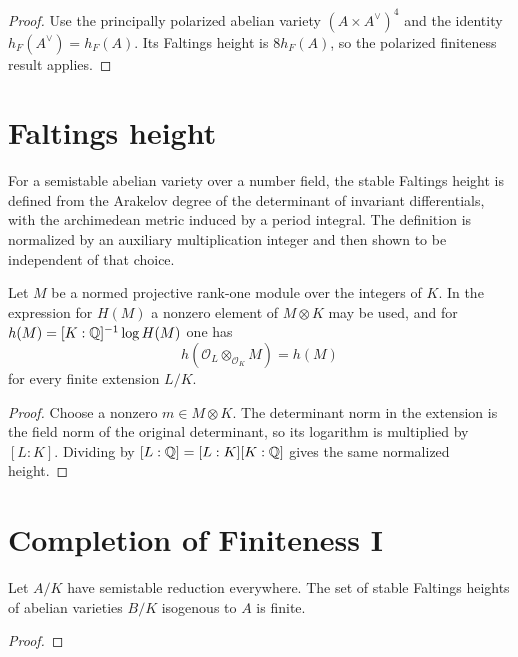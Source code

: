 \begin{proof}

Use the principally polarized abelian variety $(A\times A^\vee)^4$ and the
identity $h_F(A^\vee)=h_F(A)$.  Its Faltings height is $8h_F(A)$, so the
polarized finiteness result applies.

\end{proof}


\section{Faltings height}

\begin{definition}
\label{def:milne-faltings-height}

For a semistable abelian variety over a number field, the stable Faltings height
is defined from the Arakelov degree of the determinant of invariant
differentials, with the archimedean metric induced by a period integral.  The
definition is normalized by an auxiliary multiplication integer and then shown
to be independent of that choice.
\end{definition}

\begin{lemma}
\label{lem:milne-faltings-height-isogeny}

Let $M$ be a normed projective rank-one module over the integers of $K$.  In
the expression for $H(M)$ a nonzero element of $M\otimes K$ may be used, and
for $h(M)=[K:\mathbb{Q}]^{-1}\log H(M)$ one has
\[
h(\mathcal O_L\otimes_{\mathcal O_K}M)=h(M)
\]
for every finite extension $L/K$.
\end{lemma}
\begin{proof}
Choose a nonzero $m\in M\otimes K$.  The determinant norm in the extension
is the field norm of the original determinant, so its logarithm is multiplied
by $[L:K]$.  Dividing by $[L:\mathbb{Q}]=[L:K][K:\mathbb{Q}]$ gives the same normalized
height.
\end{proof}

\section{Completion of Finiteness I}

\begin{theorem}
\label{thm:milne-complete-finiteness-I}

Let $A/K$ have semistable reduction everywhere.  The set of stable Faltings
heights of abelian varieties $B/K$ isogenous to $A$ is finite.
\end{theorem}

\begin{proof}
\notready

\end{proof}
